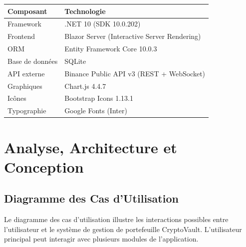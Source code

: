 \documentclass[12pt,a4paper]{article}
\begin{document}
\begin{techbox}
\begin{tabularx}{\textwidth}{lX}
    \toprule
    \textbf{Composant} & \textbf{Technologie} \\
    \midrule
    Framework & .NET 10 (SDK 10.0.202) \\
    Frontend & Blazor Server (Interactive Server Rendering) \\
    ORM & Entity Framework Core 10.0.3 \\
    Base de données & SQLite \\
    API externe & Binance Public API v3 (REST + WebSocket) \\
    Graphiques & Chart.js 4.4.7 \\
    Icônes & Bootstrap Icons 1.13.1 \\
    Typographie & Google Fonts (Inter) \\
    \bottomrule
\end{tabularx}
\end{techbox}

\section{Analyse, Architecture et Conception}

\subsection{Diagramme des Cas d'Utilisation}

Le diagramme des cas d'utilisation illustre les interactions possibles entre l'utilisateur et le système de gestion de portefeuille CryptoVault. L'utilisateur principal peut interagir avec plusieurs modules de l'application.
\end{document}
